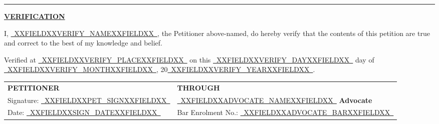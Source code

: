 \documentclass[12pt,a4paper]{article}
\newcommand{\fillline}[1]{\underline{~#1~}}
\begin{document}
\vspace{1em}
\rule{\linewidth}{0.4pt}

\begin{center}
    \textbf{\uline{VERIFICATION}}
\end{center}

\noindent I, \fillline{XXFIELDXXVERIFY_NAMEXXFIELDXX}, the Petitioner above-named, do hereby
verify that the contents of this petition are true and correct to the best
of my knowledge and belief.

\vspace{0.5em}

\noindent Verified at \fillline{XXFIELDXXVERIFY_PLACEXXFIELDXX} on this \fillline{XXFIELDXXVERIFY_DAYXXFIELDXX}
day of \fillline{XXFIELDXXVERIFY_MONTHXXFIELDXX}, 20\fillline{XXFIELDXXVERIFY_YEARXXFIELDXX}.

\vspace{2em}

\noindent
\begin{tabularx}{\textwidth}{@{}X X@{}}
    \textbf{PETITIONER} & \textbf{THROUGH}\\[2em]
    Signature: \fillline{XXFIELDXXPET_SIGNXXFIELDXX} & \fillline{XXFIELDXXADVOCATE_NAMEXXFIELDXX} \textbf{Advocate}\\[0.5em]
    Date: \fillline{XXFIELDXXSIGN_DATEXXFIELDXX} & Bar Enrolment No.: \fillline{XXFIELDXXADVOCATE_BARXXFIELDXX}\\
\end{tabularx}
\end{document}
